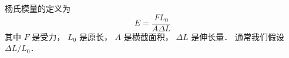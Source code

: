 
\begin{issues}
\issueDraft
\end{issues}

杨氏模量的定义为
\begin{equation}
E = \frac{FL_0}{A\Delta L}
\end{equation}
其中 $F$ 是受力， $L_0$ 是原长， $A$ 是横截面积， $\Delta L$ 是伸长量． 通常我们假设 $\Delta L/L_0$．
